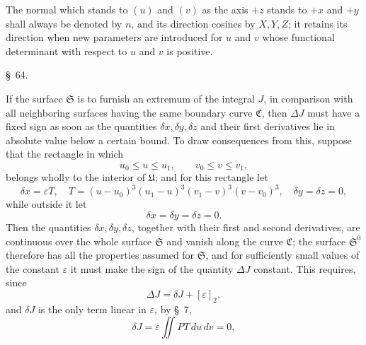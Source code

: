 \documentclass[11pt,a4paper,leqno]{article}
\begin{document}
The normal which stands to $(u)$ and $(v)$ as the axis $+z$ stands to
$+x$ and $+y$ shall always be denoted by $n$, and its direction cosines by
$X,Y,Z$; it retains its direction when new parameters are introduced for
$u$ and $v$ whose functional determinant with respect to $u$ and $v$ is positive.


\begin{center}
{\large \S~64.}
\end{center}

If the surface $\mathfrak{S}$ is to furnish an extremum of the integral
$J$, in comparison with all neighboring surfaces having the same boundary
curve $\mathfrak{C}$, then $\Delta J$ must have a fixed sign as soon as the
quantities $\delta x,\delta y,\delta z$ and their first derivatives lie in absolute
value below a certain bound. To draw consequences from this, suppose
that the rectangle in which
\begin{equation}\tag{7}
u_0\leq u\leq u_1,\qquad v_0\leq v\leq v_1,
\end{equation}
belongs wholly to the interior of $\mathfrak{U}$; and for this rectangle let
\[
\delta x=\varepsilon T,\quad
T=(u-u_0)^3(u_1-u)^3(v_1-v)^3(v-v_0)^3,
\quad \delta y=\delta z=0,
\]
while outside it let
\[
\delta x=\delta y=\delta z=0.
\]
Then the quantities $\delta x,\delta y,\delta z$, together with their first and second
derivatives, are continuous over the whole surface $\mathfrak{S}$ and vanish
along the curve $\mathfrak{C}$; the surface $\mathfrak{S}^0$ therefore has all the properties
assumed for $\mathfrak{S}$, and for sufficiently small values of the constant
$\varepsilon$ it must make the sign of the quantity $\Delta J$ constant.
This requires, since
\[
\Delta J=\delta J+[\varepsilon]_2,
\]
and $\delta J$ is the only term linear in $\varepsilon$, by \S~7,
\[
\delta J=\varepsilon\iint PT\,du\,dv=0,
\]
\end{document}
